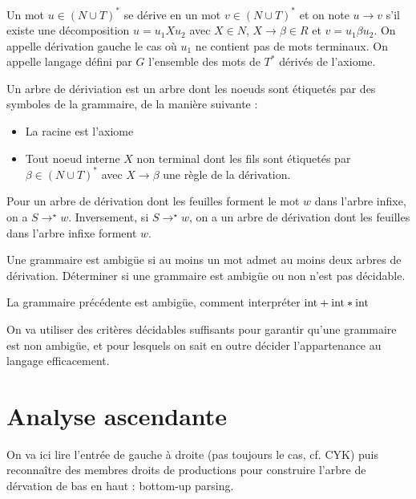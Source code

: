 \documentclass{cours}
\begin{document}
\begin{definition}
    Un mot $u \in (N\cup T)^{*}$ se dérive en un mot $v \in (N \cup T)^{*}$ et on note $u \rightarrow v$ s'il existe une décomposition $u = u_{1}Xu_{2}$ avec $X \in N$, $X \rightarrow \beta \in R$ et $v = u_{1}\beta u_{2}$. On appelle dérivation gauche le cas où $u_{1}$ ne contient pas de mots terminaux.
    On appelle langage défini par $G$ l'ensemble des mots de $T^{*}$ dérivés de l'axiome. 
\end{definition}

\begin{definition}
    Un arbre de dériviation est un arbre dont les noeuds sont étiquetés par des symboles de la grammaire, de la manière suivante : 
    \begin{itemize}
        \item La racine est l'axiome
        \item Tout noeud interne $X$ non terminal dont les fils sont étiquetés par $\beta \in (N\cup T)^{*}$ avec $X \rightarrow \beta$ une règle de la dérivation. 
    \end{itemize}
\end{definition}

Pour un arbre de dérivation dont les feuilles forment le mot $w$ dans l'arbre infixe, on a $S \rightarrow^{\star} w$. Inversement, si $S \rightarrow^{\star} w$, on a un arbre de dérivation dont les feuilles dans l'arbre infixe forment $w$. 

\begin{definition}
    Une grammaire est ambigüe si au moins un mot admet au moins deux arbres de dérivation. Déterminer si une grammaire est ambigüe ou non n'est pas décidable.
\end{definition}
La grammaire précédente est ambigüe, comment interpréter $\textmd{int} + \textmd{int} * \textmd{int}$

On va utiliser des critères décidables suffisants pour garantir qu'une grammaire est non ambigüe, et pour lesquels on sait en outre décider l'appartenance au langage efficacement.

\section{Analyse ascendante}
On va ici lire l'entrée de gauche à droite (pas toujours le cas, cf. \textmd{CYK}) puis reconnaître des membres droits de productions pour construire l'arbre de dérvation de bas en haut : bottom-up parsing.
\end{document}
